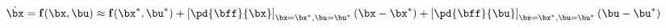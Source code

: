 \documentclass[preview]{standalone}
\begin{document}
\begin{align*}
\begin{equation}\dot\bx = {\bf f}(\bx,\bu) \approx  {\bf f}(\bx^*,\bu^*)  +  \left[ \pd{\bff}{\bx}\right]_{\bx=\bx^*,\bu=\bu^*} (\bx - \bx^*)  + \left[ \pd{\bff}{\bu}\right]_{\bx=\bx^*,\bu=\bu^*} (\bu - \bu^*)\end{equation}
\end{align*}
\end{document}
